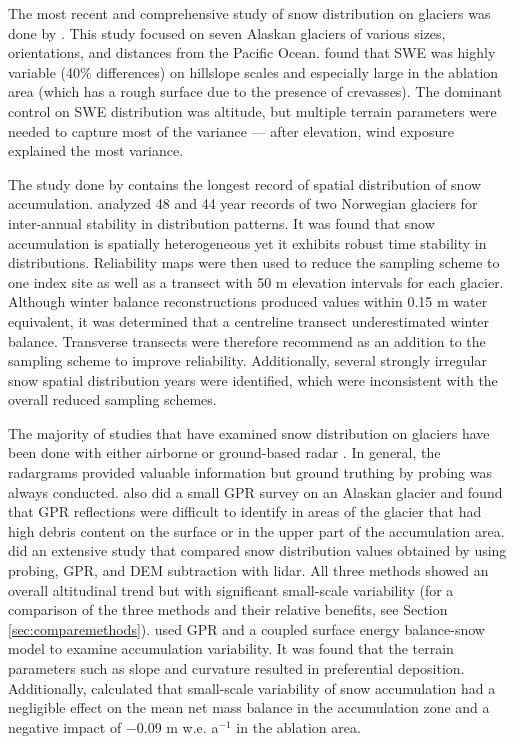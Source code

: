 \documentclass{sfuthesis}
\begin{document}
The most recent and comprehensive study of snow distribution on glaciers was done by \cite{McGrath2015}. This study focused on seven Alaskan glaciers of various sizes, orientations, and distances from the Pacific Ocean. \cite{McGrath2015} found that SWE was highly variable (40$\%$ differences) on hillslope scales and especially large in the ablation area (which has a rough surface due to the presence of crevasses). The dominant control on SWE distribution was altitude, but multiple terrain parameters were needed to capture most of the variance --- after elevation, wind exposure explained the most variance. 

The study done by \cite{Walmsley2015} contains the longest record of spatial distribution of snow accumulation. \cite{Walmsley2015} analyzed 48 and 44 year records of two Norwegian glaciers for inter-annual stability in distribution patterns. It was found that snow accumulation is spatially heterogeneous yet it exhibits robust time stability in distributions. Reliability maps were then used to reduce the sampling scheme to one index site as well as a transect with 50 m elevation intervals for each glacier. Although winter balance reconstructions produced values within 0.15 m water equivalent, it was determined that a centreline transect underestimated winter balance. Transverse transects were therefore recommend as an addition to the sampling scheme to improve reliability. Additionally, several strongly irregular snow spatial distribution years were identified, which were inconsistent with the overall reduced sampling schemes. 

The majority of studies that have examined snow distribution on glaciers have been done with either airborne or ground-based radar \citep[e.g.][]{Winther1998,Machguth2006, Grabiec2011, Pelt2014,McGrath2015}. In general, the radargrams provided valuable information but ground truthing by probing was always conducted. \cite{Gusmeroli2014} also did a small GPR survey on an Alaskan glacier and found that GPR reflections were difficult to identify in areas of the glacier that had high debris content on the surface or in the upper part of the accumulation area. \cite{Sold2013} did an extensive study that compared snow distribution values obtained by using probing, GPR, and DEM subtraction with lidar. All three methods showed an overall altitudinal trend but with significant small-scale variability (for a comparison of the three methods and their relative benefits, see Section \ref{sec:comparemethods}). \cite{Pelt2014} used GPR and a coupled surface energy balance-snow model to examine accumulation variability. It was found that the terrain parameters such as slope and curvature resulted in preferential deposition. Additionally, \cite{Pelt2014} calculated that small-scale variability of snow accumulation had a negligible effect on the mean net mass balance in the accumulation zone and a negative impact of $-$0.09 m w.e. a$^{-1}$ in the ablation area.
\end{document}
